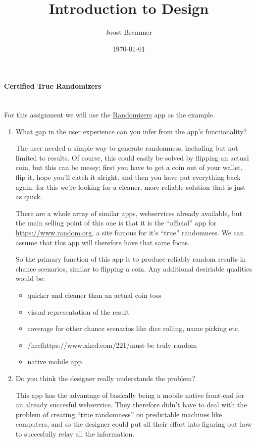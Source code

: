 \documentclass{article}
\title{Introduction to Design}
\author{Joost Bremmer}
\date{\today}
\begin{document}
\paragraph{Certified True Randomizers} \hspace{0pt} \\


For this assignment we will use the \href{https://www.random.org/app/}{Randomizers} app as the example.


\begin{enumerate}
  \item What gap in the user experience can you infer from the app’s functionality?

    The user needed a simple way to generate randomness, including but not limited to  results.
    Of course, this could easily be solved by flipping an actual coin, but this can be messy;
    first you have to get a coin out of your wallet, flip it, hope you'll catch it alright, and then you have put everything back again.
    for this we're looking for a cleaner, more reliable solution that is just as quick.

    There are a whole array of similar apps, webservices already available, but the main selling point of this one is that it is the ``official'' app
    for \url{https://www.random.org}, a site famous for it's ``true'' randomness. We can assume that this app will therefore have that same focus.

    So the primary function of this app is to produce reliably random results in  chance scenarios, similar to flipping a coin.
    Any additional desiriable qualities would be:

    \begin{itemize}
      \item quicker and cleaner than an actual coin toss
      \item visual representation of the result
      \item coverage for other chance scenarios like dice rolling, name picking etc.
      \item /href{https://www.xkcd.com/221/}{must be truly random}
      \item native mobile app
    \end{itemize}

  \item Do you think the designer really understands the problem?
    
    This app has the advantage of basically being a mobile native front-end for an already succesful webservice. 
    They therefore didn't have to deal with the problem of creating ``true randomness'' on predictable machines like computers, 
    and so the designer could put all their effort into figuring out how to succesfully relay all the information.


\end{enumerate}
\end{document}
